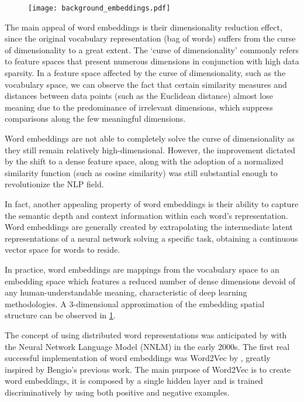 \begin{figure}[t!]
    \centering
    \texttt{[image: background\_embeddings.pdf]}
    \caption{}
    \label{fig:background_embeddings}
\end{figure}

The main appeal of word embeddings is their dimensionality reduction effect, since the original vocabulary representation (bag of words) suffers from the curse of dimensionality to a great extent.
The `curse of dimensionality' commonly refers to feature spaces that present numerous dimensions in conjunction with high data sparsity.
In a feature space affected by the curse of dimensionality, such as the vocabulary space, we can observe the fact that certain similarity measures and distances between data points (such as the Euclidean distance) almost lose meaning due to the predominance of irrelevant dimensions, which suppress comparisons along the few meaningful dimensions.

Word embeddings are not able to completely solve the curse of dimensionality as they still remain relatively high-dimensional.
However, the improvement dictated by the shift to a dense feature space, along with the adoption of a normalized similarity function (such as cosine similarity) was still substantial enough to revolutionize the NLP field.

In fact, another appealing property of word embeddings is their ability to capture the semantic depth and context information within each word's representation.
Word embeddings are generally created by extrapolating the intermediate latent representations of a neural network solving a specific task, obtaining a continuous vector space for words to reside.

In practice, word embeddings are mappings from the vocabulary space to an embedding space which features a reduced number of dense dimensions devoid of any human-understandable meaning, characteristic of deep learning methodologies.
A $3$-dimensional approximation of the embedding spatial structure can be observed in \cref{fig:background_embeddings}.

The concept of using distributed word representations was anticipated by \citet{bengio2000} with the Neural Network Language Model (NNLM) in the early 2000s.
The first real successful implementation of word embeddings was Word2Vec by \citet{mikolov2013}, greatly inspired by Bengio's previous work.
The main purpose of Word2Vec is to create word embeddings, it is composed by a single hidden layer and is trained discriminatively by using both positive and negative examples.

